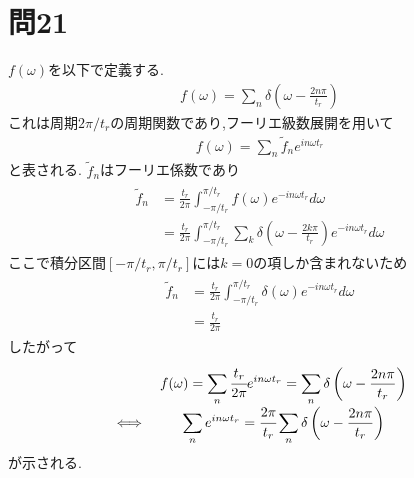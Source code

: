 \documentclass[uplatex,a4j,11pt,dvipdfmx]{jsarticle}
\begin{document}
\section*{問21}
$f(\omega)$を以下で定義する.
\begin{align}
  f(\omega)=\sum_n\delta\left(\omega-\frac{2n\pi}{t_r}\right)
\end{align}
これは周期$2\pi/t_r$の周期関数であり,フーリエ級数展開を用いて
\begin{align}
  f(\omega)=\sum_n\tilde{f}_ne^{in\omega t_r}
\end{align}
と表される.
$\tilde{f}_n$はフーリエ係数であり
\begin{align}
  \begin{split}
    \tilde{f}_n&=\frac{t_r}{2\pi}\int_{-\pi/t_r}^{\pi/t_r}f(\omega)e^{-in\omega t_r}d\omega\\
    &=\frac{t_r}{2\pi}\int_{-\pi/t_r}^{\pi/t_r}\sum_k\delta\left(\omega-\frac{2k\pi}{t_r}\right)e^{-in\omega t_r}d\omega
  \end{split}
\end{align}
ここで積分区間$[-\pi/t_r,\pi/t_r]$には$k=0$の項しか含まれないため
\begin{align}
  \begin{split}
    \tilde{f}_n&=\frac{t_r}{2\pi}\int_{-\pi/t_r}^{\pi/t_r}\delta\left(\omega\right)e^{-in\omega t_r}d\omega\\
    &=\frac{t_r}{2\pi}
  \end{split}
\end{align}
したがって
\begin{align}
  \begin{array}{cc}
    &f(\omega)=\displaystyle\sum_n\cfrac{t_r}{2\pi}e^{in\omega t_r}=\displaystyle\sum_n\delta\left(\omega-\frac{2n\pi}{t_r}\right)\\
    \iff&\displaystyle\sum_ne^{in\omega t_r}=\cfrac{2\pi}{t_r}\displaystyle\sum_n\delta\left(\omega-\frac{2n\pi}{t_r}\right)
  \end{array}
\end{align}
が示される.
\end{document}
